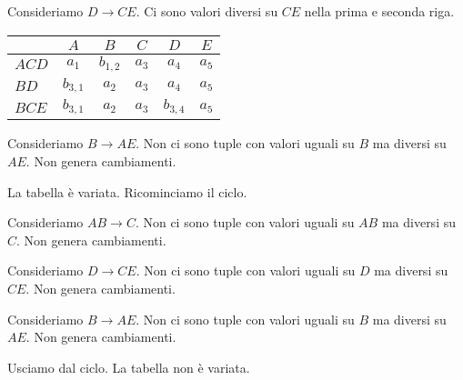 \begin{exmp}
Consideriamo $D \to CE$. Ci sono valori diversi su $CE$ nella prima e seconda riga.

\begin{tabular}{l | *{5}{c}}
 & $A$ & $B$ & $C$ & $D$ & $E$ \\
\hline
$ACD$ & $a_1$ & $b_{1,2}$ & $a_3$ & $a_4$ & \cellcolor{green!20} $a_5$ \\
$BD$ & $b_{3,1}$ & $a_2$ & $a_3$ & $a_4$ & $a_5$ \\
$BCE$ & $b_{3,1}$ & $a_2$ & $a_3$ & $b_{3,4}$ & $a_5$
\end{tabular}

Consideriamo $B \to AE$. Non ci sono tuple con valori uguali su $B$ ma diversi su $AE$. Non genera cambiamenti.

La tabella \`e variata. Ricominciamo il ciclo.

Consideriamo $AB \to C$. Non ci sono tuple con valori uguali su $AB$ ma diversi su $C$. Non genera cambiamenti.

Consideriamo $D \to CE$. Non ci sono tuple con valori uguali su $D$ ma diversi su $CE$. Non genera cambiamenti.

Consideriamo $B \to AE$. Non ci sono tuple con valori uguali su $B$ ma diversi su $AE$. Non genera cambiamenti.

Usciamo dal ciclo. La tabella non \`e variata.
\end{exmp}

